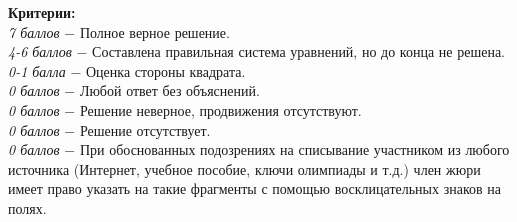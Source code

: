  \textbf{Критерии:} \\
\textit{7 баллов} $-$ Полное верное решение.\\
\textit{4-6 баллов} $-$ Составлена правильная система уравнений, но до конца не решена.\\
\textit{0-1 балла} $-$ Оценка стороны квадрата.\\
\textit{0 баллов} $-$ Любой ответ без объяснений.\\
\textit{0 баллов} $-$ Решение неверное, продвижения отсутствуют.\\
\textit{0 баллов} $-$ Решение отсутствует.\\
\textit{0 баллов} $-$ При обоснованных подозрениях на списывание участником из любого источника (Интернет, учебное пособие, ключи олимпиады и т.д.) член жюри имеет право указать на такие фрагменты с помощью восклицательных знаков на полях. \\
